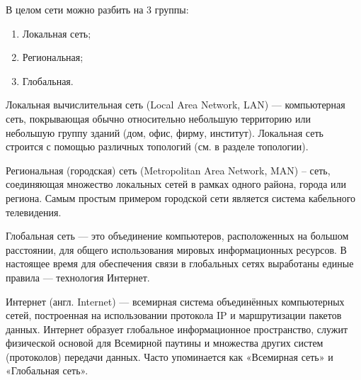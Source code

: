 В целом сети можно разбить на 3 группы:
\begin{enumerate}
	\item Локальная сеть;
	\item Региональная;
	\item Глобальная.
\end{enumerate}
	
	Локальная вычислительная сеть (Local Area Network, LAN) — компьютерная сеть, покрывающая обычно относительно небольшую территорию или небольшую группу зданий (дом, офис, фирму, институт). Локальная сеть строится с помощью различных топологий (см. в разделе топологии).
	
	
	Региональная (городская) сеть (Metropolitan Area Network, MAN) – сеть, соединяющая множество локальных сетей в рамках одного района, города или региона. Самым простым примером городской сети является система кабельного телевидения.
	
	
	Глобальная сеть — это объединение компьютеров, расположенных на большом расстоянии, для общего использования мировых информационных ресурсов. В настоящее время для обеспечения связи в глобальных сетях выработаны единые правила — технология Интернет.
	
	Интернет (англ. Internet) — всемирная система объединённых компьютерных сетей, построенная на использовании протокола IP и маршрутизации пакетов данных. Интернет образует глобальное информационное пространство, служит физической основой для Всемирной паутины и множества других систем (протоколов) передачи данных. Часто упоминается как «Всемирная сеть» и «Глобальная сеть».